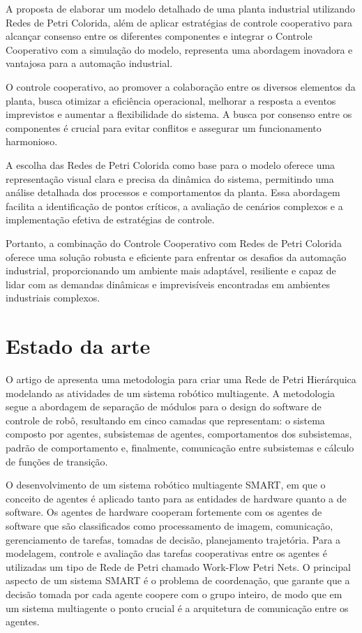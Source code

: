 A proposta de elaborar um modelo detalhado de uma planta industrial utilizando Redes de Petri Colorida, além de aplicar estratégias de controle cooperativo para alcançar consenso entre os diferentes componentes e integrar o Controle Cooperativo com a simulação do modelo, representa uma abordagem inovadora e vantajosa para a automação industrial.

O controle cooperativo, ao promover a colaboração entre os diversos elementos da planta, busca otimizar a eficiência operacional, melhorar a resposta a eventos imprevistos e aumentar a flexibilidade do sistema. A busca por consenso entre os componentes é crucial para evitar conflitos e assegurar um funcionamento harmonioso.

A escolha das Redes de Petri Colorida como base para o modelo oferece uma representação visual clara e precisa da dinâmica do sistema, permitindo uma análise detalhada dos processos e comportamentos da planta. Essa abordagem facilita a identificação de pontos críticos, a avaliação de cenários complexos e a implementação efetiva de estratégias de controle.

Portanto, a combinação do Controle Cooperativo com Redes de Petri Colorida oferece uma solução robusta e eficiente para enfrentar os desafios da automação industrial, proporcionando um ambiente mais adaptável, resiliente e capaz de lidar com as demandas dinâmicas e imprevisíveis encontradas em ambientes industriais complexos.


\section{Estado da arte}

O artigo de \cite{robotic2020} apresenta uma metodologia para criar uma Rede de Petri Hierárquica modelando as atividades de um sistema robótico multiagente. A metodologia segue a abordagem de separação de módulos para o design do software de controle de robô, resultando em cinco camadas que representam: o sistema composto por agentes, subsistemas de agentes, comportamentos dos subsistemas, padrão de comportamento e, finalmente, comunicação entre subsistemas e cálculo de funções de transição. 

O desenvolvimento de um sistema robótico multiagente SMART, em que o conceito de agentes é aplicado tanto para as entidades de hardware quanto a de software.  Os agentes de hardware cooperam fortemente com os agentes de software que são classificados como processamento de imagem, comunicação, gerenciamento de tarefas, tomadas de decisão, planejamento trajetória. Para a modelagem, controle e avaliação das tarefas cooperativas entre os agentes é utilizadas um tipo de Rede de Petri chamado Work-Flow Petri Nets. O principal aspecto de um sistema SMART é o problema de coordenação, que garante que a decisão tomada por cada agente coopere com o grupo inteiro, de modo que em um sistema multiagente o ponto crucial é a arquitetura de comunicação entre os agentes. \cite{smart2013}

